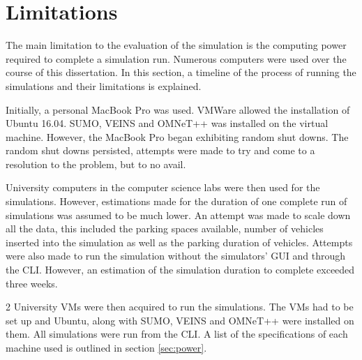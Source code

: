 \section{Limitations}
The main limitation to the evaluation of the simulation is the computing power required to complete a simulation run. Numerous computers were used over the course of this dissertation. In this section, a timeline of the process of running the simulations and their limitations is explained.

Initially, a personal MacBook Pro was used. VMWare allowed the installation of Ubuntu 16.04. \ac{SUMO}, \ac{VEINS} and \ac{OMNeT++} was installed on the virtual machine. However, the MacBook Pro began exhibiting random shut downs. The random shut downs persisted, attempts were made to try and come to a resolution to the problem, but to no avail.

University computers in the computer science labs were then used for the simulations. However, estimations made for the duration of one complete run of simulations was assumed to be much lower. An attempt was made to scale down all the data, this included the parking spaces available, number of vehicles inserted into the simulation as well as the parking duration of vehicles. Attempts were also made to run the simulation without the simulators' \ac{GUI} and through the \ac{CLI}. However, an estimation of the simulation duration to complete exceeded three weeks.

2 University VMs were then acquired to run the simulations. The VMs had to be set up and Ubuntu, along with \ac{SUMO}, \ac{VEINS} and \ac{OMNeT++} were installed on them. All simulations were run from the \ac{CLI}. A list of the specifications of each machine used is outlined in section \ref{sec:power}.
